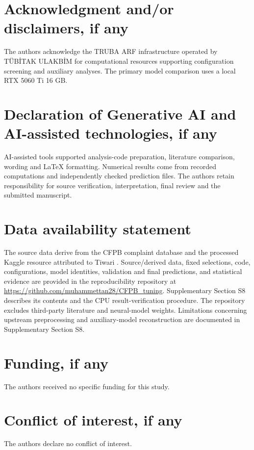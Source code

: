 \documentclass{elektr}
\begin{document}
\section*{Acknowledgment and/or disclaimers, if any}
The authors acknowledge the TRUBA ARF infrastructure operated by T\"UB\.{I}TAK ULAKB\.{I}M for computational resources supporting configuration screening and auxiliary analyses. The primary model comparison uses a local RTX 5060 Ti 16 GB.

\section*{Declaration of Generative AI and AI-assisted technologies, if any}
AI-assisted tools supported analysis-code preparation, literature comparison, wording and LaTeX formatting. Numerical results come from recorded computations and independently checked prediction files. The authors retain responsibility for source verification, interpretation, final review and the submitted manuscript.

\section*{Data availability statement}
The source data derive from the CFPB complaint database and the processed Kaggle resource attributed to Tiwari \cite{cfpbdata,tiwari2021complaints}. Source/derived data, fixed selections, code, configurations, model identities, validation and final predictions, and statistical evidence are provided in the reproducibility repository at \url{https://github.com/muhammettan28/CFPB_tuning}. Supplementary Section S8 describes its contents and the CPU result-verification procedure. The repository excludes third-party literature and neural-model weights. Limitations concerning upstream preprocessing and auxiliary-model reconstruction are documented in Supplementary Section S8.

\section*{Funding, if any}
The authors received no specific funding for this study.
\section*{Conflict of interest, if any}
The authors declare no conflict of interest.
\end{document}
